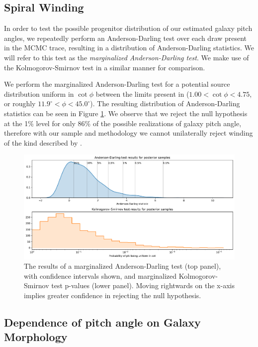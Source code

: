
\subsection{Spiral Winding}
\label{section:spiral_winding}
In order to test the possible progenitor distribution of our estimated galaxy pitch angles, we repeatedly perform an Anderson-Darling test over each draw present in the MCMC trace, resulting in a distribution of Anderson-Darling statistics. We will refer to this test as the \textit{marginalized Anderson-Darling test}. We make use of the Kolmogorov-Smirnov test in a similar manner for comparison.

We perform the marginalized Anderson-Darling test for a potential source distribution uniform in $\cot\phi$ between the limits present in \citet{2019arXiv190910291P} ($1.00 < \cot\phi < 4.75$, or roughly $11.9^\circ < \phi < 45.0^\circ$). The resulting distribution of Anderson-Darling statistics can be seen in Figure \ref{fig:ad-cot-test}. We observe that we reject the null hypothesis at the 1\% level for only 86\% of the possible realizations of galaxy pitch angle, therefore with our sample and methodology we cannot unilaterally reject winding of the kind described by \citet{2019arXiv190910291P}.

\begin{figure}
  \includegraphics[width=17.7cm]{plots/cot_uniform_marginalized_tests.pdf}
  \caption{The results of a marginalized Anderson-Darling test (top panel), with confidence intervals shown, and marginalized Kolmogorov-Smirnov test p-values (lower panel). Moving rightwards on the x-axis implies greater confidence in rejecting the null hypothesis.}
  \label{fig:ad-cot-test}
\end{figure}

\subsection{Dependence of pitch angle on Galaxy Morphology}
\label{section:morphology_comparision}

